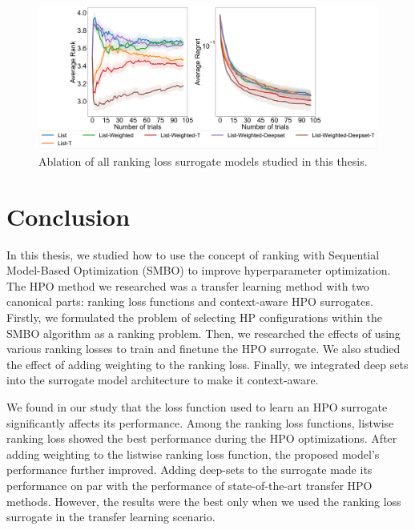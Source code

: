 \documentclass[12pt, twoside, ngerman]{report}
\begin{document}
\begin{figure}[h]
  \centering
    \includegraphics[scale=0.22]{images/FinalAblation}
    \caption{Ablation of all ranking loss surrogate models studied in this thesis.}
    \label{fig:FinalAblation}
\end{figure}

\chapter{Conclusion}

In this thesis, we studied how to use the concept of ranking with Sequential Model-Based Optimization (SMBO) to improve hyperparameter optimization. The HPO method we researched was a transfer learning method with two canonical parts: ranking loss functions and context-aware HPO surrogates. Firstly, we formulated the problem of selecting HP configurations within the SMBO algorithm as a ranking problem. Then, we researched the effects of using various ranking losses to train and finetune the HPO surrogate. We also studied the effect of adding weighting to the ranking loss. Finally, we integrated deep sets into the surrogate model architecture to make it context-aware.

We found in our study that the loss function used to learn an HPO surrogate significantly affects its performance. Among the ranking loss functions, listwise ranking loss showed the best performance during the HPO optimizations. After adding weighting to the listwise ranking loss function, the proposed model's performance further improved. Adding deep-sets to the surrogate made its performance on par with the performance of state-of-the-art transfer HPO methods. However, the results were the best only when we used the ranking loss surrogate in the transfer learning scenario.
\end{document}
